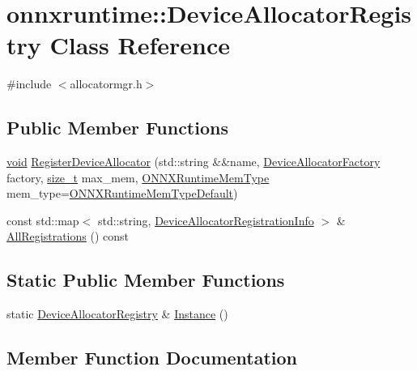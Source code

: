 \hypertarget{classonnxruntime_1_1DeviceAllocatorRegistry}{}\section{onnxruntime\+:\+:Device\+Allocator\+Registry Class Reference}
\label{classonnxruntime_1_1DeviceAllocatorRegistry}


{\ttfamily \#include $<$allocatormgr.\+h$>$}

\subsection*{Public Member Functions}
\begin{DoxyCompactItemize}
\item 
\mbox{\hyperlink{mlasi_8h_a88f941d423cb2a819b70a1358982b1a6}{void}} \mbox{\hyperlink{classonnxruntime_1_1DeviceAllocatorRegistry_a8a8726e82472e896399ada58ca96a7e6}{Register\+Device\+Allocator}} (std\+::string \&\&name, \mbox{\hyperlink{namespaceonnxruntime_ae1af56abbcfb3524284e0de4567f94ac}{Device\+Allocator\+Factory}} factory, \mbox{\hyperlink{mlasi_8h_a503efbc1c6e50825320ad909366b78ab}{size\+\_\+t}} max\+\_\+mem, \mbox{\hyperlink{allocator__info_8h_add3f8ee3ff93395704abae71c30cab18}{O\+N\+N\+X\+Runtime\+Mem\+Type}} mem\+\_\+type=\mbox{\hyperlink{allocator__info_8h_add3f8ee3ff93395704abae71c30cab18a232271cbf46c229ed40272a63af7a204}{O\+N\+N\+X\+Runtime\+Mem\+Type\+Default}})
\item 
const std\+::map$<$ std\+::string, \mbox{\hyperlink{structonnxruntime_1_1DeviceAllocatorRegistrationInfo}{Device\+Allocator\+Registration\+Info}} $>$ \& \mbox{\hyperlink{classonnxruntime_1_1DeviceAllocatorRegistry_adc34c090f3adbb82e21b33285dd4ede8}{All\+Registrations}} () const
\end{DoxyCompactItemize}
\subsection*{Static Public Member Functions}
\begin{DoxyCompactItemize}
\item 
static \mbox{\hyperlink{classonnxruntime_1_1DeviceAllocatorRegistry}{Device\+Allocator\+Registry}} \& \mbox{\hyperlink{classonnxruntime_1_1DeviceAllocatorRegistry_a609445dbdd058a88b1fa44ddd18e0972}{Instance}} ()
\end{DoxyCompactItemize}


\subsection{Member Function Documentation}
\mbox{\label{classonnxruntime_1_1DeviceAllocatorRegistry_adc34c090f3adbb82e21b33285dd4ede8}} 
